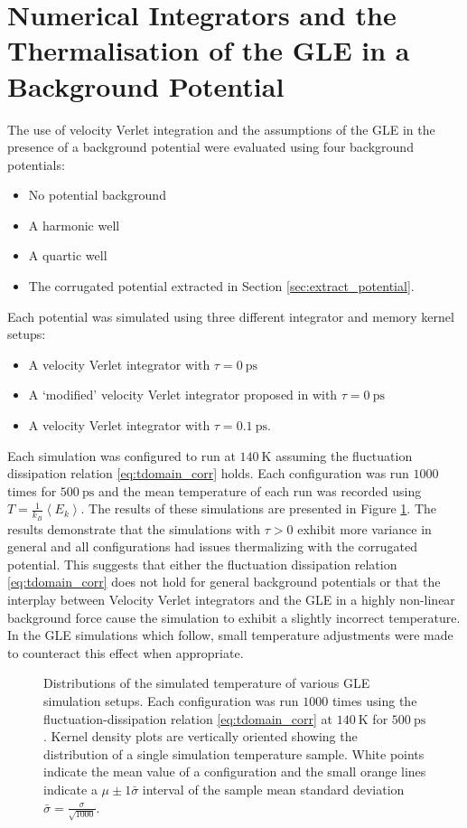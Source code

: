 \section{Numerical Integrators and the Thermalisation of the GLE in a Background Potential} \label{sec:thermalization}

The use of velocity Verlet integration and the assumptions of the GLE in the presence of a background potential were evaluated using four background potentials:
\begin{itemize}
  \item No potential background
  \item A harmonic well
  \item A quartic well
  \item The corrugated potential extracted in Section \ref{sec:extract_potential}.
\end{itemize}
Each potential was simulated using three different integrator and memory kernel setups:
\begin{itemize}
	\item A velocity Verlet integrator with $\tau=\SI{0}{\ps}$
	\item A `modified' velocity Verlet integrator proposed in \cite{gronbech2013simple} with $\tau=\SI{0}{\ps}$
	\item A velocity Verlet integrator with $\tau=\SI{0.1}{\ps}$.
\end{itemize}
Each simulation was configured to run at $\SI{140}{\kelvin}$ assuming the fluctuation dissipation relation \ref{eq:tdomain_corr} holds. Each configuration was run $1000$ times for $\SI{500}{\pico\second}$ and the mean temperature of each run was recorded using $T=\frac{1}{k_B}\left<E_k\right>$. The results of these simulations are presented in Figure \ref{fig:thermalization_results}. The results demonstrate that the simulations with $\tau > 0$ exhibit more variance in general and all configurations had issues thermalizing with the corrugated potential. This suggests that either the fluctuation dissipation relation \ref{eq:tdomain_corr} does not hold for general background potentials or that the interplay between Velocity Verlet integrators and the GLE in a highly non-linear background force cause the simulation to exhibit a slightly incorrect temperature. In the GLE simulations which follow, small temperature adjustments were made to counteract this effect when appropriate. 

\begin{figure}
	\caption{Distributions of the simulated temperature of various GLE simulation setups. Each configuration was run $1000$ times using the fluctuation-dissipation relation \ref{eq:tdomain_corr} at $\SI{140}{\kelvin}$ for $\SI{500}{\pico\second}$. Kernel density plots are vertically oriented showing the distribution of a single simulation temperature sample. White points indicate the mean value of a configuration and the small orange lines indicate a $\mu \pm 1\bar{\sigma}$ interval of the sample mean standard deviation $\bar{\sigma}=\frac{\sigma}{\sqrt{1000}}$.}
	\label{fig:thermalization_results}
\end{figure}

